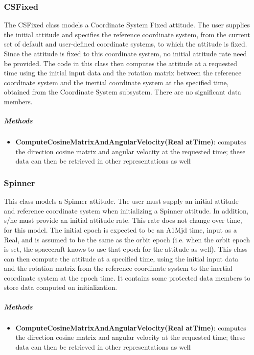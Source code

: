 \subsubsection{CSFixed}

The CSFixed class models a Coordinate System Fixed attitude.  The user supplies the initial attitude and specifies the reference coordinate system, from the current set of default and user-defined coordinate systems, to which the attitude is fixed.  Since the attitude is fixed to this coordinate system, no initial attitude rate need be provided.  The code in this class then computes the attitude at a requested time using the initial input data and the rotation matrix between the reference coordinate system and the inertial coordinate system at the specified time, obtained from the Coordinate System subsystem.  There are no significant data members.

\subparagraph{\textit{Methods}}

\begin{itemize}
\item \textbf{ComputeCosineMatrixAndAngularVelocity(Real atTime)}: computes the direction cosine matrix and angular velocity at the requested time; these data can then be retrieved in other representations as well
\end{itemize}

\subsubsection{Spinner}

This class models a Spinner attitude.  The user must supply an initial attitude and reference coordinate system when initializing a Spinner attitude.  In addition, s/he must provide an initial attitude rate.  This rate does not change over time, for this model.  The initial epoch is expected to be an A1Mjd time, input as a Real, and is assumed to be the same as the orbit epoch (i.e. when the orbit epoch is set, the spacecraft knows to use that epoch for the attitude as well).  This class can then compute the attitude at a specified time, using the initial input data and the rotation matrix from the reference coordinate system to the inertial coordinate system at the epoch time.  It contains some protected data members to store data computed on initialization.

\subparagraph{\textit{Methods}}

\begin{itemize}
\item \textbf{ComputeCosineMatrixAndAngularVelocity(Real atTime)}: computes the direction cosine matrix and angular velocity at the requested time; these data can then be retrieved in other representations as well
\end{itemize}

